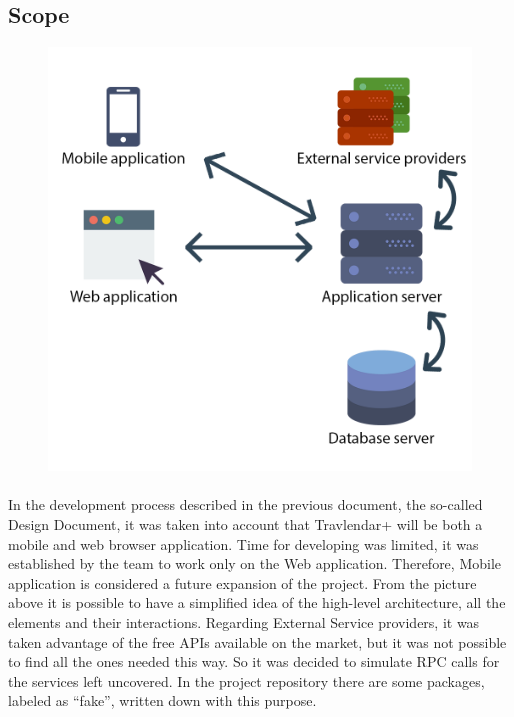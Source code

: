 \documentclass{article}
\begin{document}
		\subsection{Scope}
			\begin{figure}[H]
			\includegraphics[width=\linewidth]{Images/Architecture/Architecture_design_2.png}
			\label{fig:Architecture}
			\end{figure}
			\paragraph{}In the development process described in the previous document, the so-called Design Document, it was taken into account that Travlendar+ will be both a mobile and web browser application. Time for developing was limited, it was established by the team to work only on the Web application. Therefore, Mobile application is considered a future expansion of the project. From the picture above it is possible to have a simplified idea of the high-level architecture, all the elements and their interactions. Regarding External Service providers, it was taken advantage of the free APIs available on the market, but it was not possible to find all the ones needed this way. So it was decided to simulate RPC calls for the services left uncovered. In the project repository there are some packages, labeled as “fake”, written down with this purpose. \\
\end{document}
